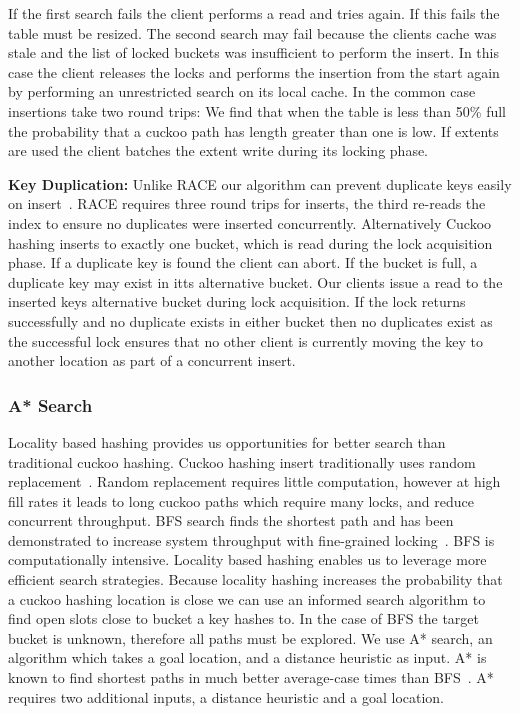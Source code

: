 If the first search fails the client performs a read and
tries again. If this fails the table must be resized. The
second search may fail because the clients cache was stale
and the list of locked buckets was insufficient to perform
the insert. In this case the client releases the locks and
performs the insertion from the start again by performing an
unrestricted search on its local cache. In the common case
insertions take two round trips: We find that when the table is less
than 50\% full the probability that a cuckoo path has
length greater than one is low. If extents are
used the client batches the extent write during its locking
phase.

\textbf{Key Duplication:} Unlike RACE our algorithm can
prevent duplicate keys easily on insert~\cite{race}. RACE
requires three round trips for inserts, the third re-reads
the index to ensure no duplicates were inserted
concurrently.  Alternatively Cuckoo hashing inserts to
exactly one bucket, which is read during the lock
acquisition phase. If a duplicate key is found the client
can abort. If the bucket is full, a duplicate key may exist
in itts alternative bucket. Our clients issue a read to the
inserted keys alternative bucket during lock acquisition. If
the lock returns successfully and no duplicate exists in
either bucket then no duplicates exist as the successful
lock ensures that no other client is currently moving the
key to another location as part of a concurrent insert.


\subsubsection{A* Search} 

Locality based hashing provides us opportunities for better
search than traditional cuckoo hashing. Cuckoo hashing
insert traditionally uses random replacement~\cite{cuckoo}.
Random replacement requires little computation, however at
high fill rates it leads to long cuckoo paths which require
many locks, and reduce concurrent throughput. BFS search
finds the shortest path and has been demonstrated to
increase system throughput with fine-grained
locking~\cite{cuckoo-improvements}.  BFS is
computationally intensive. Locality based hashing enables us
to leverage more efficient search strategies. Because
locality hashing increases the probability that a cuckoo
hashing location is close we can use an informed search
algorithm to find open slots close to bucket a key hashes
to. 
In the case of BFS the target bucket is unknown, therefore
all paths must be explored. We use A* search, an algorithm
which takes a goal location, and a distance heuristic as
input. A* is known to find shortest paths in much better
average-case times than BFS~\cite{}. A* requires two additional
inputs, a distance heuristic and a goal location.

